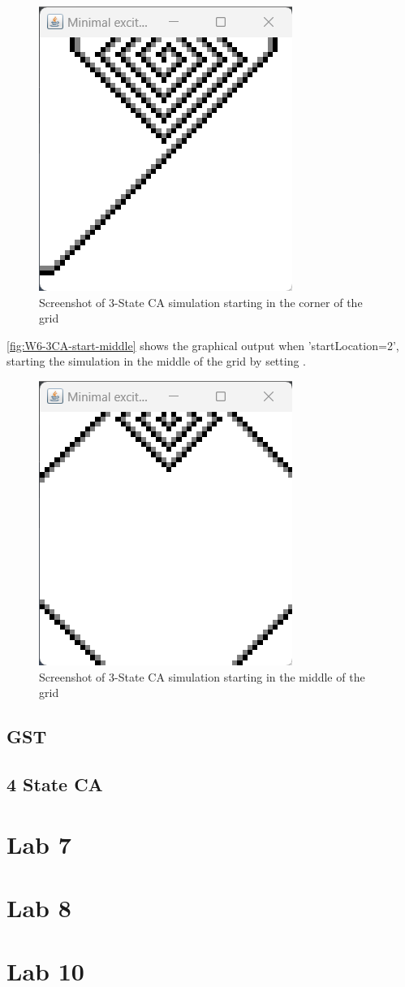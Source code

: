 \begin{figure}[H] 
    \centering
    \includegraphics[width=0.49\columnwidth]{Figures/Week 6/3stateCA-CORNER-output.png}
    \caption{Screenshot of 3-State CA simulation starting in the corner of the grid}
    \label{fig:W6-3CA-start-corner}
\end{figure}

\autoref{fig:W6-3CA-start-middle} shows the graphical output when 'startLocation=2', starting the simulation in the middle of the grid by setting . 
\begin{figure}[H] 
    \centering
    \includegraphics[width=0.49\columnwidth]{Figures/Week 6/3stateCA-MIDDLE-output.png}
    \caption{Screenshot of 3-State CA simulation starting in the middle of the grid}
    \label{fig:W6-3CA-start-middle}
\end{figure}

\subsection{GST}


\subsection{4 State CA}
\newpage
\section{Lab 7}
\newpage
\section{Lab 8}
\newpage
\section{Lab 10}

